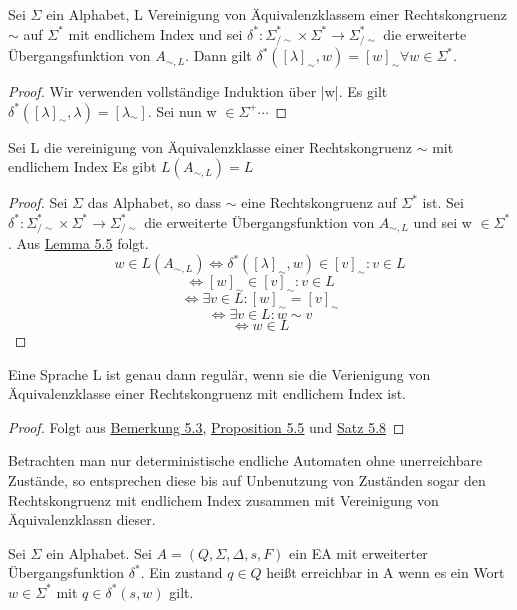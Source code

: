   Sei \(\Sigma\) ein Alphabet, L Vereinigung von Äquivalenzklassem einer Rechtskongruenz \(\sim\) auf \(\Sigma^{*}\) mit endlichem Index und sei \(\delta^{*} : \Sigma^{*}_{/\sim} \times \Sigma^{*} \rightarrow \Sigma^{*}_{/\sim}\) die erweiterte Übergangsfunktion von \(A_{\sim, L}\). Dann gilt \(\delta^{*}([\lambda]_{\sim}, w) = [w]_{\sim} \forall w \in \Sigma^{*}\). 
  \begin{proof}
    Wir verwenden vollständige Induktion über |w|. Es gilt \(\delta^{*}([\lambda]_{\sim}, \lambda) = [\lambda_{\sim}]\). Sei nun w \(\in \Sigma^{+} \cdots\)  
  \end{proof}

  Sei L die vereinigung von Äquivalenzklasse einer Rechtskongruenz \(\sim\) mit endlichem Index Es gibt \(L(A_{\sim, L}) = L\) 
  \begin{proof}
    Sei \(\Sigma\) das Alphabet, so dass \(\sim\) eine Rechtskongruenz auf \(\Sigma^{*}\) ist. Sei \(\delta^{*} : \Sigma^{*}_{/\sim} \times \Sigma^{*} \rightarrow \Sigma^{*}_{/\sim}\) die erweiterte Übergangsfunktion von \(A_{\sim, L}\) und sei w \(\in \Sigma^{*}\). Aus \hyperref[subsec:5.5]{Lemma 5.5} folgt. 
    \[w \in L(A_{\sim, L}) \Leftrightarrow \delta^{*}([\lambda]_{\sim}, w) \in {[v]_{\sim} : v \in L}\]
    \[\Leftrightarrow [w]_{\sim} \in {[v]_{\sim} : v\in L}\]
    \[\Leftrightarrow \exists v \in L : [w]_{\sim} = [v]_{\sim}\]
    \[\Leftrightarrow \exists v \in L : w \sim v\]
    \[\Leftrightarrow w \in L\]
  \end{proof}

  Eine Sprache L ist genau dann regulär, wenn sie die Verienigung von Äquivalenzklasse einer Rechtskongruenz mit endlichem Index ist. 
  \begin{proof}
    Folgt aus \hyperref[subsec:5.3]{Bemerkung 5.3}, \hyperref[subsec:5.5]{Proposition 5.5} und \hyperref[subsec:5.8]{Satz 5.8}
  \end{proof}
  Betrachten man nur deterministische endliche Automaten ohne unerreichbare Zustände, so entsprechen diese bis auf Unbenutzung von Zuständen sogar den Rechtskongruenz mit endlichem Index zusammen mit Vereinigung von Äquivalenzklassn dieser.

  Sei \(\Sigma\) ein Alphabet. Sei \(A = (Q, \Sigma, \Delta, s, F)\) ein EA mit erweiterter Übergangsfunktion \(\delta^{*}\). Ein zustand \(q\in Q\) heißt erreichbar in A wenn es ein Wort \(w \in \Sigma ^{*}\) mit \(q\in \delta^{*}(s, w)\) gilt.

